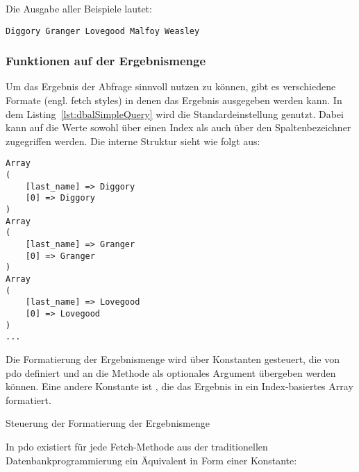 Die Ausgabe aller Beispiele lautet:
\begin{Verbatim}
Diggory Granger Lovegood Malfoy Weasley
\end{Verbatim}

\newpage

\subsubsection{Funktionen auf der Ergebnismenge}
\label{basics:doctrine:subsubsec:resultSet}
Um das Ergebnis der Abfrage sinnvoll nutzen zu können, gibt es verschiedene Formate (engl. fetch styles) in denen das Ergebnis ausgegeben werden kann. In dem Listing~\ref{lst:dbalSimpleQuery} wird die Standardeinstellung  genutzt. Dabei kann auf die Werte sowohl über einen Index als auch über den Spaltenbezeichner zugegriffen werden. Die interne Struktur sieht wie folgt aus:


\begin{Verbatim}
Array
(
    [last_name] => Diggory
    [0] => Diggory
)
Array
(
    [last_name] => Granger
    [0] => Granger
)
Array
(
    [last_name] => Lovegood
    [0] => Lovegood
)
...
\end{Verbatim}

Die Formatierung der Ergebnismenge wird über Konstanten gesteuert, die von \gls{pdo} definiert und an die Methode  als optionales Argument übergeben werden können. Eine andere Konstante ist , die das Ergebnis in ein Index-basiertes Array formatiert.

\begin{listing}[H]
\caption{Steuerung der Formatierung der Ergebnismenge}
\label{lst:fetchNum}
\end{listing}

In \gls{pdo} existiert für jede Fetch-Methode aus der traditionellen Datenbankprogrammierung ein Äquivalent in Form einer Konstante:

